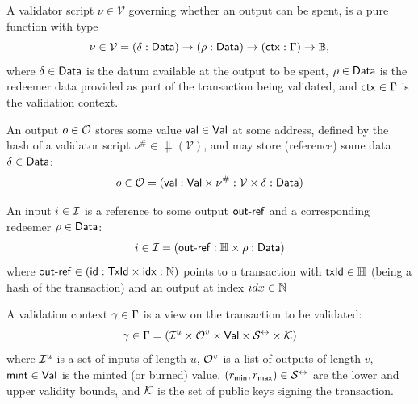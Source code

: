 \begin{definition}
  A validator script $\nu \in \mathcal{V}$ governing whether an output can be
  spent, is a pure function with type
  \[
    \nu \in \mathcal{V} = (\delta : \mathsf{Data}) \to (\rho : \mathsf{Data}) \to (\mathsf{ctx} : \Gamma) \to\mathbb{B},
  \]
  where $\delta \in \mathsf{Data}$ is the datum available at the output to be spent,
  $\rho \in \mathsf{Data}$ is the redeemer data provided as part of the transaction
  being validated, and $\mathsf{ctx} \in \Gamma$ is the validation
  context.
\end{definition}

\begin{definition}[Outputs]
  An output $o \in \mathcal{O}$ stores some value $\mathsf{val} \in \mathsf{Val}$ at some address,
  defined by the hash of a validator script $\nu^{\#} \in \hash(\mathcal{V})$,
  and may store (reference) some data $\delta \in \mathsf{Data}$:
  \[
    o \in \mathcal{O} = (\mathsf{val} : \mathsf{Val} \times \nu^{\#} : \mathcal{V} \times \delta : \mathsf{Data})
  \]
\end{definition}

\begin{definition}[Inputs]
  An input $i \in \mathcal{I}$ is a reference to some output $\mathsf{out\textsf{-}{}ref}$ and a
  corresponding redeemer $\rho \in \mathsf{Data}$:
  \[
    i \in \mathcal{I} = (\mathsf{out\textsf{-}{}ref} : \mathbb{H} \times \rho : \mathsf{Data})
  \]
  where
  $\mathsf{out\textsf{-}{}ref} \in (\mathsf{id} : \mathsf{TxId} \times \mathsf{idx} : \mathbb{N})$
  points to a transaction with $\mathsf{txId} \in \mathbb{H}$ (being a hash of the
  transaction) and an output at index $idx \in \mathbb{N}$
\end{definition}

\begin{definition}
  A validation context $\gamma \in \Gamma$ is a view on the transaction
  to be validated:
  \[
    \gamma \in \Gamma = (\mathcal{I}^u \times \mathcal{O}^v \times \mathsf{Val} \times \mathcal{S}^{\leftrightarrow} \times \mathcal K)
  \]
  where $\mathcal{I}^u$ is a set of inputs of length $u$, $\mathcal{O}^v$ is a list
  of outputs of length $v$, $\mathsf{mint} \in \mathsf{Val}$ is the minted (or
  burned) value, $(r_{\mathsf{min}}, r_{\mathsf{max}}) \in \mathcal{S}^{\leftrightarrow}$
   are the lower and upper
  validity bounds, and $\mathcal K$ is the set of public keys signing the transaction.
\end{definition}

